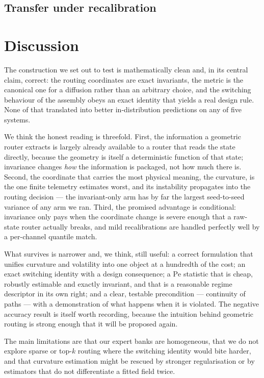 \documentclass[11pt]{article}
\newcommand{\Pen}{\mathrm{Pe}}
\begin{document}

\subsection{Transfer under recalibration}


\section{Discussion}

The construction we set out to test is mathematically clean and, in its central
claim, correct: the routing coordinates are exact invariants, the metric is the
canonical one for a diffusion rather than an arbitrary choice, and the
switching behaviour of the assembly obeys an exact identity that yields a real
design rule. None of that translated into better in-distribution predictions on
any of five systems.

We think the honest reading is threefold. First, the information a geometric
router extracts is largely already available to a router that reads the state
directly, because the geometry is itself a deterministic function of that
state; invariance changes \emph{how} the information is packaged, not how much
there is. Second, the coordinate that carries the most physical meaning, the
curvature, is the one finite telemetry estimates worst, and its instability
propagates into the routing decision --- the invariant-only arm has by far the
largest seed-to-seed variance of any arm we ran. Third, the promised advantage
is conditional: invariance only pays when the coordinate change is severe
enough that a raw-state router actually breaks, and mild recalibrations are
handled perfectly well by a per-channel quantile match.

What survives is narrower and, we think, still useful: a correct formulation
that unifies curvature and volatility into one object at a hundredth of the
cost; an exact switching identity with a design consequence; a $\Pen$ statistic
that is cheap, robustly estimable and exactly invariant, and that is a
reasonable regime descriptor in its own right; and a clear, testable
precondition --- continuity of paths --- with a demonstration of what happens
when it is violated. The negative accuracy result is itself worth recording,
because the intuition behind geometric routing is strong enough that it will be
proposed again.

The main limitations are that our expert banks are homogeneous, that we do not
explore sparse or top-$k$ routing where the switching identity would bite
harder, and that curvature estimation might be rescued by stronger
regularisation or by estimators that do not differentiate a fitted field twice.
\end{document}
